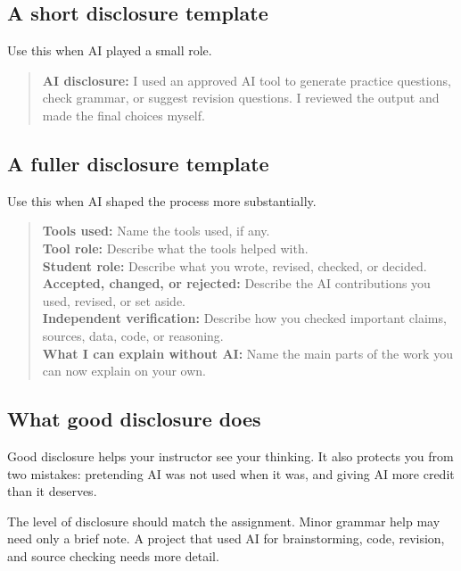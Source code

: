 \documentclass{SIAMbook2023}
\begin{document}
\subsection{A short disclosure template}
\label{subsec:short-disclosure}%

Use this when AI played a small role.

\begin{quote}
\textbf{AI disclosure:} I used an approved AI tool to generate practice questions, check grammar, or suggest revision questions. I reviewed the output and made the final choices myself.
\end{quote}

\subsection{A fuller disclosure template}
\label{subsec:full-disclosure}

Use this when AI shaped the process more substantially.

\begin{quote}
\textbf{Tools used:} Name the tools used, if any.\\
\textbf{Tool role:} Describe what the tools helped with.\\
\textbf{Student role:} Describe what you wrote, revised, checked, or decided.\\
\textbf{Accepted, changed, or rejected:} Describe the AI contributions you used, revised, or set aside.\\
\textbf{Independent verification:} Describe how you checked important claims, sources, data, code, or reasoning.\\
\textbf{What I can explain without AI:} Name the main parts of the work you can now explain on your own.
\end{quote}

\subsection{What good disclosure does}
\label{subsec:good-disclosure}

Good disclosure helps your instructor see your thinking. It also protects you from two mistakes: pretending AI was not used when it was, and giving AI more credit than it deserves.

The level of disclosure should match the assignment. Minor grammar help may need only a brief note. A project that used AI for brainstorming, code, revision, and source checking needs more detail.
\end{document}
